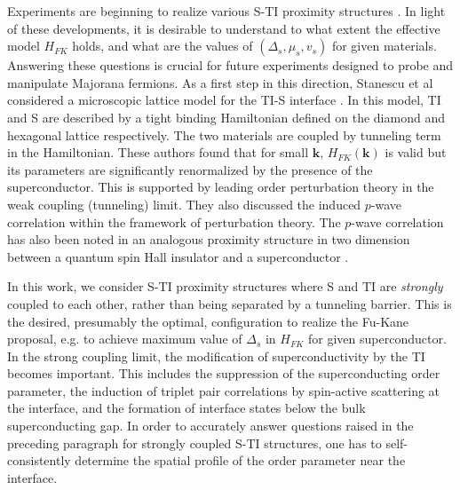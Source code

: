 Experiments are beginning to realize various S-TI proximity structures \cite{sca,march1,march2}.
In light of these developments, it is desirable to
understand to what extent the effective model $H_{FK}$ holds,
and what are the values of $(\Delta_s,\mu_s,v_s)$ for given materials. 
Answering these questions is crucial for future experiments designed to probe
and manipulate Majorana fermions. As a first step in this
direction, Stanescu et al considered a microscopic lattice model
for the TI-S interface \cite{stan}. In this model, TI and S are described by a tight binding 
Hamiltonian defined on the diamond and hexagonal lattice respectively.
The two materials are coupled by tunneling term in the Hamiltonian. 
These authors found that 
for small $\mathbf{k}$, $H_{FK}(\mathbf{k})$ is valid but its parameters are 
significantly renormalized by the presence of the superconductor. 
This is supported by leading order 
perturbation theory in the weak coupling (tunneling) limit. They also
discussed the induced $p$-wave correlation within the framework of
perturbation theory. The $p$-wave correlation has also been noted in 
an analogous proximity structure in two dimension between
a quantum spin Hall insulator and a superconductor \cite{ann}.


In this work, we consider S-TI proximity structures where 
S and TI are {\it strongly} coupled to each other, 
rather than being separated by a tunneling barrier.
This is the desired, presumably the optimal, configuration to realize the Fu-Kane
proposal, e.g. to achieve maximum value of $\Delta_s$ in $H_{FK}$ for given
superconductor. 
In the strong coupling limit, 
the modification of superconductivity by the TI becomes important.
This includes the suppression of the superconducting order parameter,
the induction of triplet pair correlations by spin-active scattering
at the interface, and the formation of interface states below the bulk superconducting gap.
In order to accurately answer questions raised in the preceding paragraph
for strongly coupled S-TI structures, one has to self-consistently 
determine the spatial profile of 
the order parameter near the interface.

